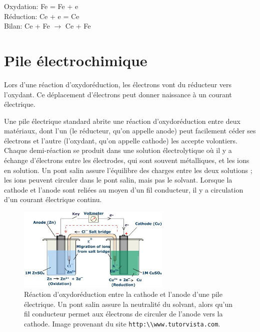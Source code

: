\documentclass[12pt,oneside,letterpaper]{article}
\begin{document}
\begin{center}
Oxydation: Fe = Fe + e\up{--}\\
Réduction: Ce + e\up{--} = Ce\\
Bilan: Ce + Fe $\rightarrow$ Ce + Fe
\end{center}


\section{Pile électrochimique}

Lors d'une réaction d'oxydoréduction, les électrons vont du réducteur vers l'oxydant. Ce déplacement d'électrons peut donner naissance à un courant électrique.

Une pile électrique standard abrite une réaction d'oxydoréduction entre deux matériaux, dont l'un (le réducteur, qu'on appelle anode) peut facilement céder ses électrons et l'autre (l'oxydant, qu'on appelle cathode) les accepte volontiers. Chaque demi-réaction se produit dans une solution électrolytique où il y a échange d'électrons entre les électrodes, qui sont souvent métalliques, et les ions en solution. Un pont salin assure l'équilibre des charges entre les deux solutions ; les ions peuvent circuler dans le pont salin, mais pas le solvant. Lorsque la cathode et l'anode sont reliées au moyen d'un fil conducteur, il y a circulation d'un courant électrique continu.

\begin{figure}[h]
\begin{center}
\includegraphics[width=0.65\textwidth]{ElectricCell}
\caption{\label{Pauling}Réaction d'oxydoréduction entre la cathode et l'anode d'une pile électrique. Un pont salin assure la neutralité du solvant, alors qu'un fil conducteur permet aux électrons de circuler de l'anode vers la cathode. Image provenant du site \texttt{http:\textbackslash\textbackslash www.tutorvista.com}.}
\end{center}
\end{figure}
\end{document}
